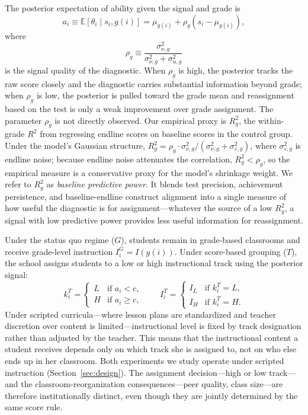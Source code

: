 \documentclass[11pt]{article}
\newcommand{\E}{\mathbb{E}}
\begin{document}
The posterior expectation of ability given the signal and grade is
\begin{equation}
\label{eq:posterior}
a_i \equiv \E[\theta_i \mid s_i, g(i)] = \mu_{g(i)} + \rho_g(s_i - \mu_{g(i)}),
\end{equation}
where
\begin{equation}
\label{eq:signal_quality}
\rho_g \equiv \frac{\sigma^2_{\nu,g}}{\sigma^2_{\nu,g} + \sigma^2_{u,g}}
\end{equation}
is the signal quality of the diagnostic. When $\rho_g$ is high, the posterior tracks the raw score closely and the diagnostic carries substantial information beyond grade; when $\rho_g$ is low, the posterior is pulled toward the grade mean and reassignment based on the test is only a weak improvement over grade assignment. The parameter $\rho_g$ is not directly observed. Our empirical proxy is $R^2_g$, the within-grade $R^2$ from regressing endline scores on baseline scores in the control group. Under the model's Gaussian structure, $R^2_g = \rho_g \cdot \sigma^2_{\nu,g}/(\sigma^2_{\nu,g} + \sigma^2_{\varepsilon,g})$, where $\sigma^2_{\varepsilon,g}$ is endline noise; because endline noise attenuates the correlation, $R^2_g < \rho_g$, so the empirical measure is a conservative proxy for the model's shrinkage weight. We refer to $R^2_g$ as \emph{baseline predictive power}. It blends test precision, achievement persistence, and baseline-endline construct alignment into a single measure of how useful the diagnostic is for assignment---whatever the source of a low $R^2_g$, a signal with low predictive power provides less useful information for reassignment.

Under the status quo regime ($G$), students remain in grade-based classrooms and receive grade-level instruction $I_i^G = I(g(i))$. Under score-based grouping ($T$), the school assigns students to a low or high instructional track using the posterior signal:
\begin{equation}
k_i^T =
\begin{cases}
L & \text{if } a_i < c, \\
H & \text{if } a_i \geq c,
\end{cases}
\qquad
I_i^T =
\begin{cases}
I_L & \text{if } k_i^T = L, \\
I_H & \text{if } k_i^T = H.
\end{cases}
\end{equation}
Under scripted curricula---where lesson plans are standardized and teacher discretion over content is limited---instructional level is fixed by track designation rather than adjusted by the teacher. This means that the instructional content a student receives depends only on which track she is assigned to, not on who else ends up in her classroom. Both experiments we study operate under scripted instruction (Section~\ref{sec:design}). The assignment decision---high or low track---and the classroom-reorganization consequences---peer quality, class size---are therefore institutionally distinct, even though they are jointly determined by the same score rule.
\end{document}
